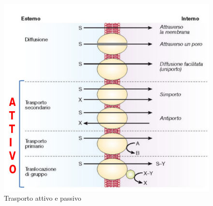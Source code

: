 \documentclass[11pt]{book}
\begin{document}
\begin{figure}[htp]
\centering
\includegraphics[scale=0.5]{img/Trasporto attivo e passivo.png}
\caption{Trasporto attivo e passivo}
\label{}
\end{figure}
\end{document}
